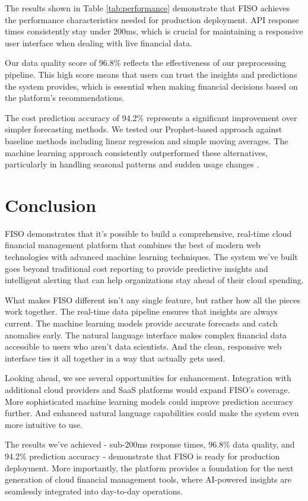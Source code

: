 \documentclass[conference]{IEEEtran}
\begin{document}
The results shown in Table \ref{tab:performance} demonstrate that FISO achieves the performance characteristics needed for production deployment. API response times consistently stay under 200ms, which is crucial for maintaining a responsive user interface when dealing with live financial data.

Our data quality score of 96.8\% reflects the effectiveness of our preprocessing pipeline. This high score means that users can trust the insights and predictions the system provides, which is essential when making financial decisions based on the platform's recommendations.

The cost prediction accuracy of 94.2\% represents a significant improvement over simpler forecasting methods. We tested our Prophet-based approach against baseline methods including linear regression and simple moving averages. The machine learning approach consistently outperformed these alternatives, particularly in handling seasonal patterns and sudden usage changes \cite{taylor2018forecasting}.

\section{Conclusion}

FISO demonstrates that it's possible to build a comprehensive, real-time cloud financial management platform that combines the best of modern web technologies with advanced machine learning techniques. The system we've built goes beyond traditional cost reporting to provide predictive insights and intelligent alerting that can help organizations stay ahead of their cloud spending.

What makes FISO different isn't any single feature, but rather how all the pieces work together. The real-time data pipeline ensures that insights are always current. The machine learning models provide accurate forecasts and catch anomalies early. The natural language interface makes complex financial data accessible to users who aren't data scientists. And the clean, responsive web interface ties it all together in a way that actually gets used.

Looking ahead, we see several opportunities for enhancement. Integration with additional cloud providers and SaaS platforms would expand FISO's coverage. More sophisticated machine learning models could improve prediction accuracy further. And enhanced natural language capabilities could make the system even more intuitive to use.

The results we've achieved - sub-200ms response times, 96.8\% data quality, and 94.2\% prediction accuracy - demonstrate that FISO is ready for production deployment. More importantly, the platform provides a foundation for the next generation of cloud financial management tools, where AI-powered insights are seamlessly integrated into day-to-day operations.



\end{document}
